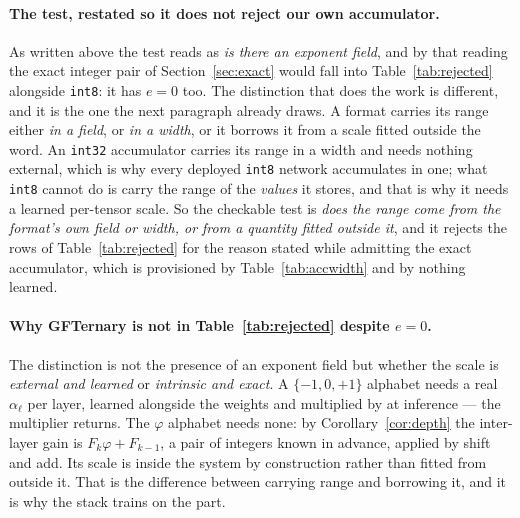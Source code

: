 \documentclass[11pt]{article}
\theoremstyle{definition}
\begin{document}
\paragraph{The test, restated so it does not reject our own accumulator.} As
written above the test reads as \emph{is there an exponent field}, and by that
reading the exact integer pair of Section~\ref{sec:exact} would fall into
Table~\ref{tab:rejected} alongside \texttt{int8}: it has $e=0$ too. The
distinction that does the work is different, and it is the one the next paragraph
already draws. A format carries its range either \emph{in a field}, or \emph{in a
width}, or it borrows it from a scale fitted outside the word. An
\texttt{int32} accumulator carries its range in a width and needs nothing
external, which is why every deployed \texttt{int8} network accumulates in one;
what \texttt{int8} cannot do is carry the range of the \emph{values} it stores,
and that is why it needs a learned per-tensor scale. So the checkable test is
\emph{does the range come from the format's own field or width, or from a
quantity fitted outside it}, and it rejects the rows of
Table~\ref{tab:rejected} for the reason stated while admitting the exact
accumulator, which is provisioned by Table~\ref{tab:accwidth} and by nothing
learned.

\paragraph{Why GFTernary is not in Table~\ref{tab:rejected} despite $e=0$.}
The distinction is not the presence of an exponent field but whether the scale is
\emph{external and learned} or \emph{intrinsic and exact}. A $\{-1,0,+1\}$
alphabet needs a real $\alpha_\ell$ per layer, learned alongside the weights and
multiplied by at inference --- the multiplier returns. The $\varphi$ alphabet
needs none: by Corollary~\ref{cor:depth} the inter-layer gain is
$F_k\varphi + F_{k-1}$, a pair of integers known in advance, applied by shift and
add. Its scale is inside the system by construction rather than fitted from
outside it. That is the difference between carrying range and borrowing it, and
it is why the stack trains on the part.
\end{document}
